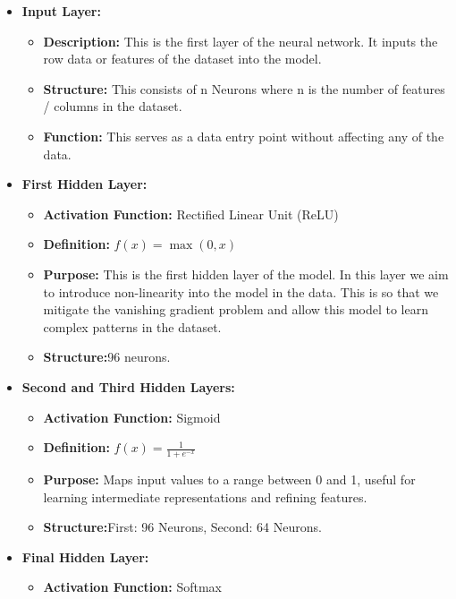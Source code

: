 \documentclass[12pt,a4paper]{article}
\begin{document}
\newpage
\begin{itemize}
    \item \textbf{Input Layer:}
    \begin{itemize}
        \item \textbf{Description:} This is the first layer of the neural network. It inputs the row data or features of the dataset into the model.
        \item \textbf{Structure:} This consists of n Neurons where n is the number of features / columns in the dataset.
        \item \textbf{Function:} This serves as a data entry point without affecting any of the data.
    \end{itemize}
    \vspace{1cm}
    \item \textbf{First Hidden Layer:}
    \begin{itemize}
        \item \textbf{Activation Function:} Rectified Linear Unit (ReLU)
        \item \textbf{Definition:} \( f(x) = \max(0, x) \)
        \item \textbf{Purpose:} This is the first hidden layer of the model. In this layer we aim to introduce non-linearity into the model in the data.
        This is so that we mitigate the vanishing gradient problem and allow this model to learn complex patterns in the dataset.
        \item \textbf{Structure:}96 neurons.
    \end{itemize}
    \vspace{1cm}
    \item \textbf{Second and Third Hidden Layers:}
    \begin{itemize}
        \item \textbf{Activation Function:} Sigmoid
        \item \textbf{Definition:} \( f(x) = \frac{1}{1 + e^{-x}} \)
        \item \textbf{Purpose:} Maps input values to a range between 0 and 1, useful for learning intermediate representations and refining features.
        \item \textbf{Structure:}First: 96 Neurons, Second: 64 Neurons.
    \end{itemize}
    \vspace{1cm}
    \item \textbf{Final Hidden Layer:}
    \begin{itemize}
        \item \textbf{Activation Function:} Softmax

\end{itemize}
\end{itemize}
\end{document}
